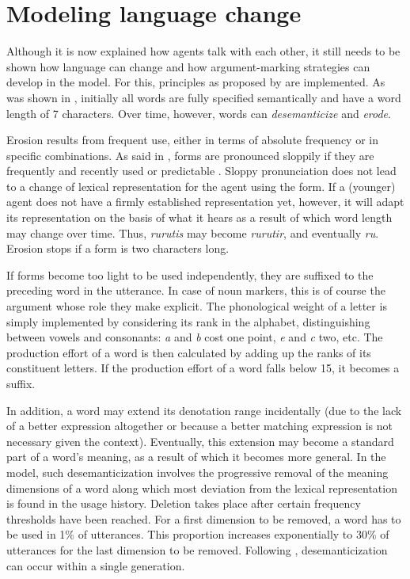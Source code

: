 \documentclass[output=paper]{LSP/langsci}
\begin{document}
\section{Modeling language change}\label{17-le-sec:Language-Change}
Although it is now explained how agents talk with each other, it still needs to be shown how language can change and how argument-marking strategies can develop in the model. For this,  principles as proposed by \cite{Heineetal2007Genesis} are implemented. As was shown in , initially all words are fully specified semantically and have a word length of 7 characters. Over time, however, words can \textit{desemanticize} and \textit{erode}. 

Erosion results from frequent use, either in terms of absolute frequency or in specific combinations. As said in , forms are pronounced sloppily if they are frequently and recently used or predictable \citep{Jurafskyetal2001Probabilistic}. Sloppy pronunciation does not lead to a change of lexical representation for the agent using the form. If a (younger) agent does not have a firmly established representation yet, however, it will adapt its representation on the basis of what it hears as a result of which word length may change over time. Thus, \textit{rurutis} may become \textit{rurutir}, and eventually \textit{ru}. Erosion stops if a form is two characters long. 

If forms become too light to be used independently, they are suffixed to the preceding word in the utterance. In case of noun markers, this is of course the argument whose role they make explicit. The phonological weight of a letter is simply implemented by considering its rank in the alphabet, distinguishing between vowels and consonants: \textit{a} and \textit{b} cost one point, \textit{e} and \textit{c} two, etc. The production effort of a word is then calculated by adding up the ranks of its constituent letters. If the production effort of a word falls below 15, it becomes a suffix.

In addition, a word may extend its denotation range	incidentally (due to the lack of a better expression altogether or because a better matching expression is not necessary given the context). Eventually, this extension may become a standard part of a word's meaning, as a result of which it becomes more general. In the model, such desemanticization involves the progressive removal of the meaning dimensions of a word along which most deviation from the lexical representation is found in the usage history. Deletion takes place after certain frequency thresholds have been reached. For a first dimension to be removed, a word has to be used in 1\% of utterances. This proportion increases exponentially to 30\% of utterances for the last dimension to be removed. Following \cite{Bybee2010Language}, desemanticization can occur within a single generation.
\end{document}
